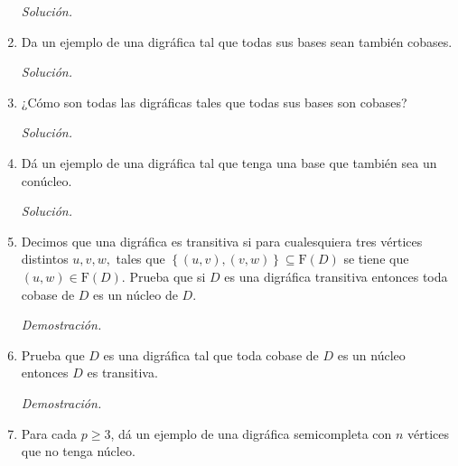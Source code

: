 \documentclass[12pt, fleqn]{article}
\newcommand{\F}[1]{\mathrm{F} \! \left( #1 \right)}
\begin{document}
\begin{enumerate}
		\emph{Solución.}

		
		
		\item Da un ejemplo de una digráfica tal que todas sus bases sean también cobases.
		
		\emph{Solución.}

		
		
		\item ¿Cómo son todas las digráficas tales que todas sus bases son cobases?
		
		\emph{Solución.}

		
		
		\item Dá un ejemplo de una digráfica tal que tenga una base que también sea un conúcleo.
		
		\emph{Solución.}

		
		
		\item Decimos que una digráfica es transitiva si para cualesquiera tres vértices distintos $ u, v, w, $ tales que $ \left\lbrace (u, v), (v,w) \right\rbrace \subseteq \F{D} $ se tiene que $ (u,w) \in \F{D} $. Prueba que si $D$ es una digráfica transitiva entonces toda cobase de $D$ es un núcleo de $D$.
		
		\emph{Demostración.}

		
		
		\item Prueba que $D$ es una digráfica tal que toda cobase de $D$ es un núcleo entonces $D$ es transitiva.
		
		\emph{Demostración.}

		
		
		\item Para cada $ p \geq 3 $, dá un ejemplo de una digráfica semicompleta con $n$ vértices que no tenga núcleo.
		

\end{enumerate}
\end{document}
